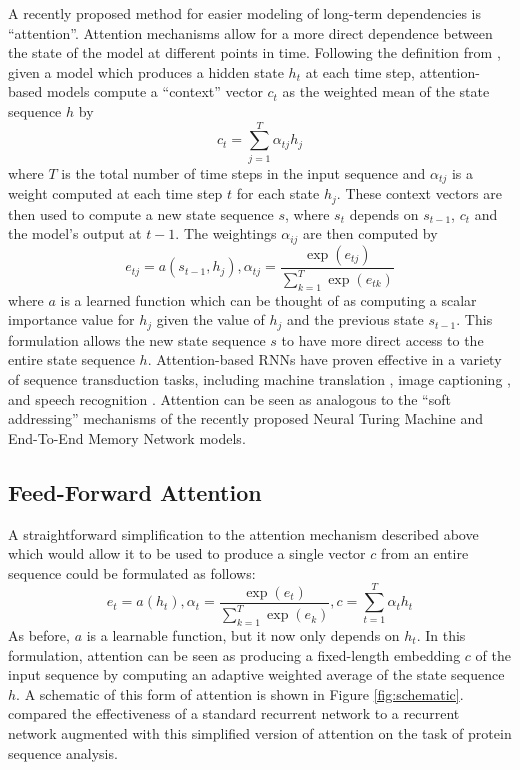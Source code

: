 \documentclass{article} %
\begin{document}
A recently proposed method for easier modeling of long-term dependencies is ``attention''.
Attention mechanisms allow for a more direct dependence between the state of the model at different points in time.
Following the definition from \citep{bahdanau2014neural}, given a model which produces a hidden state $h_t$ at each time step, attention-based models compute a ``context'' vector $c_t$ as the weighted mean of the state sequence $h$ by
$$
c_t = \sum_{j = 1}^T \alpha_{tj} h_j
$$
where $T$ is the total number of time steps in the input sequence and $\alpha_{tj}$ is a weight computed at each time step $t$ for each state $h_j$.
These context vectors are then used to compute a new state sequence $s$, where $s_t$ depends on $s_{t - 1}$, $c_t$ and the model's output at $t - 1$.
The weightings $\alpha_{ij}$ are then computed by
\begin{equation*}
e_{tj} = a(s_{t - 1}, h_j), \alpha_{tj} = \frac{\exp(e_{tj})}{\sum_{k = 1}^T \exp(e_{tk})}
\end{equation*}
where $a$ is a learned function which can be thought of as computing a scalar importance value for $h_j$ given the value of $h_j$ and the previous state $s_{t - 1}$.
This formulation allows the new state sequence $s$ to have more direct access to the entire state sequence $h$.
Attention-based RNNs have proven effective in a variety of sequence transduction tasks, including machine translation \citep{bahdanau2014neural}, image captioning \citep{xu2015show}, and speech recognition \citep{chan2015listen,bahdanau2015end}.
Attention can be seen as analogous to the ``soft addressing'' mechanisms of the recently proposed Neural Turing Machine \citep{graves2014neural} and End-To-End Memory Network \citep{sukhbaatar2015end} models.

\subsection{Feed-Forward Attention}

A straightforward simplification to the attention mechanism described above which would allow it to be used to produce a single vector $c$ from an entire sequence could be formulated as follows:
\begin{equation}
\label{eq:ffattention}
e_t = a(h_t), \alpha_t = \frac{\exp(e_t)}{\sum_{k = 1}^T \exp(e_k)}, c = \sum_{t = 1}^T \alpha_t h_t
\end{equation}
As before, $a$ is a learnable function, but it now only depends on $h_t$.
In this formulation, attention can be seen as producing a fixed-length embedding $c$ of the input sequence by computing an adaptive weighted average of the state sequence $h$.
A schematic of this form of attention is shown in Figure \ref{fig:schematic}.
\cite{sonderby2015convolutional} compared the effectiveness of a standard recurrent network to a recurrent network augmented with this simplified version of attention on the task of protein sequence analysis.
\end{document}
